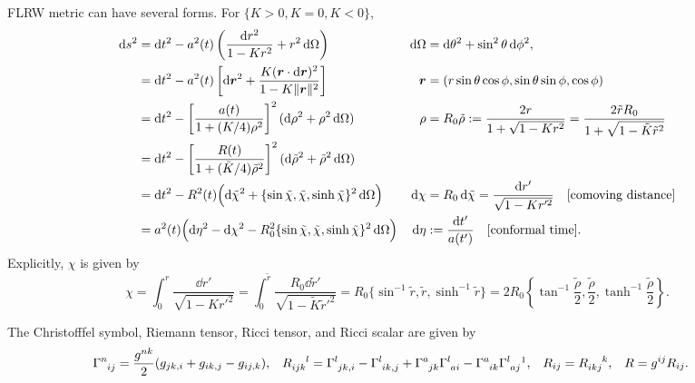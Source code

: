 \documentclass[CheatSheet]{subfiles}
\begin{document}
FLRW metric can have several forms. For $\{K>0,K=0,K<0\}$,
\begin{align}
\dd s^2
&= \dd t^2-a^2(t)\left(\frac{\dd r^2}{1- K r^2}+ r^2\dd\Omega\right)
&\dd\Omega &= \dd\theta^2+\sin^2\theta\dd\phi^2,
\\&= \dd t^2-a^2(t)\left[\dd\vc r^2 + \frac{K(\vc r\cdot\dd\vc r)^2}{1-K\|\vc r\|^2}\right]
&\vc r&=(r\sin\theta\cos\phi,\sin\theta\sin\phi,\cos\phi)
\\&= \dd t^2-\left[\frac{a(t)}{1 + (K/4)\rho^2}\right]^2(\dd\rho^2 + \rho^2\dd\Omega)
     &\rho&=R_0 \tilde \rho:=\frac{2r}{1+\sqrt{1-Kr^2}}=\frac{2\tilde r R_0}{1+\sqrt{1-\tilde K\tilde r^2}}
\\&= \dd t^2-\left[\frac{R(t)}{1 + (\tilde K/4){\tilde\rho}^2}\right]^2(\dd{\tilde\rho}^2 + {\tilde\rho}^2\dd\Omega)
\\
&=
\dd t^2-R^2(t)\Bigl(\dd{\tilde\chi}^2 + \{\sin\tilde\chi,\tilde\chi,\sinh\tilde\chi\}^2\dd\Omega\Bigr)
&\dd\chi&=R_0\dd\tilde\chi = \frac{\dd r'}{\sqrt{1-K r'^2}}
\quad\text{[comoving distance]}
\\
&=a^2(t)\Bigl(
\dd\eta^2-\dd{\chi}^2 - R_0^2\{\sin\tilde\chi,\tilde\chi,\sinh\tilde\chi\}^2\dd\Omega
\Bigr)
&\dd\eta& := \frac{\dd t'}{a(t')}
\quad\text{[conformal time]}.
\end{align}
Explicitly, $\chi$ is given by
\begin{equation}
 \chi
  = \int_0^r\frac{\dd r'}{\sqrt{1-K r'^2}}
  = \int_0^{\tilde r}\frac{R_0\dd \tilde r'}{\sqrt{1-\tilde K \tilde r'^2}}
  = R_0\{\sin^{-1}\tilde r,\tilde r,\sinh^{-1}\tilde r\}
  = 2R_0\left\{\tan^{-1}\frac{\tilde \rho}{2}, \frac{\tilde\rho}{2},\tanh^{-1}\frac{\tilde \rho}{2}\right\}.
\end{equation}

The Christofffel symbol, Riemann tensor, Ricci tensor, and Ricci scalar are given by
\begin{align*}
 \tensor{\Gamma}{^n_i_j} &= \frac{g^{nk}}{2}(g_{jk,i}+g_{ik,j}-g_{ij,k}),
 &\tensor{R}{_i_j_k^l} &=
 \tensor{\Gamma}{^l_{jk,i}}
 -\tensor{\Gamma}{^l_{ik,j}}
 +\tensor{\Gamma}{^a_j_k}\tensor\Gamma{^l_a_i}
 -\tensor{\Gamma}{^a_i_k}\tensor\Gamma{^l_a_j}\footnotemark,
& {R}_{ij}&=\tensor{R}{_i_k_j^k},
& R &= g^{ij}R_{ij}.
\end{align*}
\end{document}
